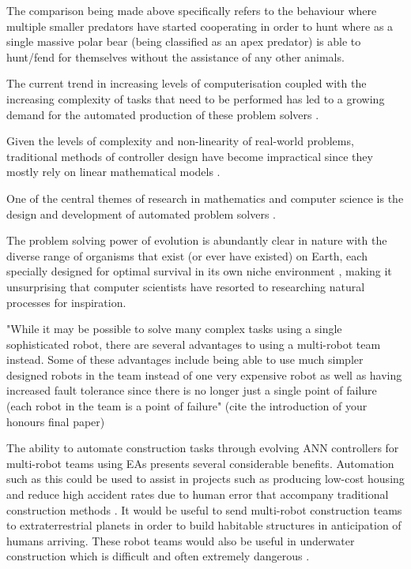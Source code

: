 The comparison being made above specifically refers to the behaviour where multiple smaller predators have started cooperating in order to hunt where as a single massive polar bear (being classified as an apex predator) is able to hunt/fend for themselves without the assistance of any other animals.


The current trend in increasing levels of computerisation coupled with the increasing complexity of tasks that need to be performed has led to a growing demand for the automated production of these problem solvers \cite{RefWorks:33}.

Given the levels of complexity and non-linearity of real-world problems, traditional methods of controller design have become impractical since they mostly rely on linear mathematical models \cite{RefWorks:32}.

One of the central themes of research in mathematics and computer science is the design and development of automated problem solvers \cite{RefWorks:33}.

The problem solving power of evolution is abundantly clear in nature with the diverse range of organisms that exist (or ever have existed) on Earth, each specially designed for optimal survival in its own niche environment \cite{RefWorks:33}, making it unsurprising that computer scientists have resorted to researching natural processes for inspiration. 

"While it may be possible to solve many complex tasks using a single sophisticated robot, there are several advantages to using a multi-robot team instead. Some of these advantages include being able to use much simpler designed robots in the team instead of one very expensive robot as well as having increased fault tolerance since there is no longer just a single point of failure (each robot in the team is a point of failure" (cite the introduction of your honours final paper)

The ability to automate construction tasks through evolving ANN controllers for multi-robot teams using EAs presents several considerable benefits. Automation such as this could be used to assist in projects such as producing low-cost housing and reduce high accident rates due to human error that accompany traditional construction methods \cite{Khoshnevis2003}. It would be useful to send multi-robot construction teams to extraterrestrial planets in order to build habitable structures in anticipation of humans arriving. These robot teams would also be useful in underwater construction which is difficult and often extremely dangerous \cite{RefWorks:30}.


